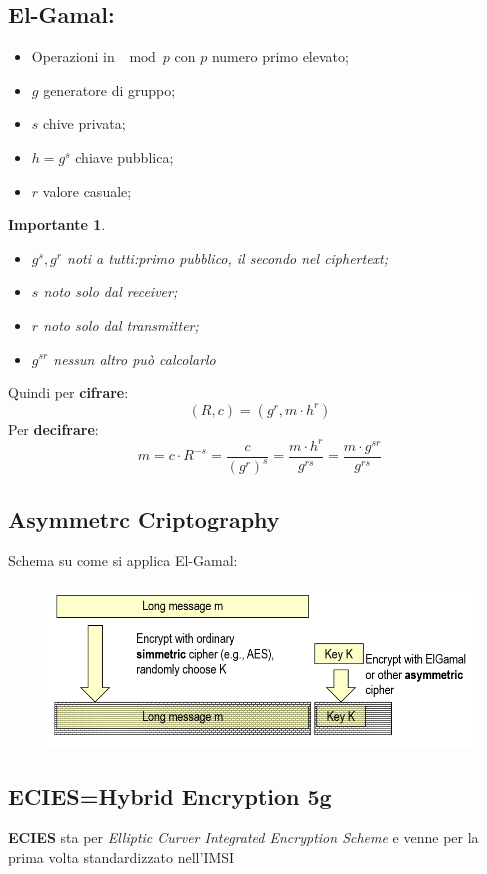 \documentclass{book}
\newtheorem*{Importante}{\textbf{Importante}}
\begin{document}
\subsection{El-Gamal:\@Sketch}
\begin{itemize}
    \item Operazioni in \(\mod{p}\) con \(p\) numero primo elevato;
    \item \(g\) generatore di gruppo;
    \item \(s\) chive privata;
    \item \(h=g^{s}\) chiave pubblica;
    \item \(r\) valore casuale;
\end{itemize}
\begin{Importante}
    \begin{itemize}
        \item \(g^{s},g^{r}\) noti a tutti:\@il primo pubblico, il secondo nel ciphertext;
        \item \(s\) noto solo dal receiver;
        \item \(r\) noto solo dal transmitter;
        \item \(g^{sr}\) nessun altro può calcolarlo
    \end{itemize}
\end{Importante}
Quindi per \textbf{cifrare}:\begin{equation*}
    (R,c)=(g^{r},m\cdot h^{r})
\end{equation*}
Per \textbf{decifrare}:\begin{equation*}
    m=c\cdot R^{-s}=\frac{c}{{(g^{r})}^{s}}=\frac{m\cdot h^{r}}{g^{rs}}=\frac{m\cdot g^{sr}}{g^{rs}}
\end{equation*}
\newpage
\subsection{Asymmetrc Criptography}
Schema su come si applica El-Gamal:
\begin{figure}[ht]
    \centering
    \includegraphics[scale=0.5]{2022-01-03-15-37-08.png}%
\end{figure}
\subsection{ECIES=Hybrid Encryption 5g}
\textbf{ECIES} sta per \emph{Elliptic Curver Integrated Encryption Scheme} e venne per la prima volta standardizzato nell'IMSI
\end{document}
